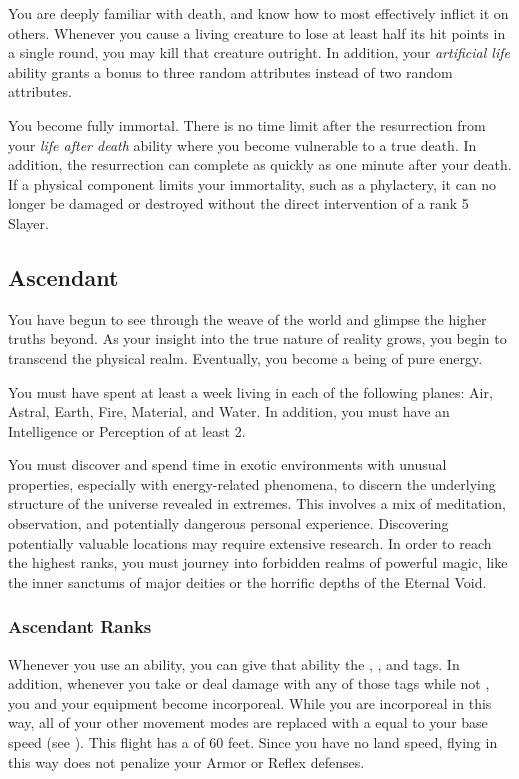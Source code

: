        You are deeply familiar with death, and know how to most effectively inflict it on others.
      Whenever you cause a living creature to lose at least half its hit points in a single round, you may kill that creature outright.
      In addition, your \textit{artificial life} ability grants a bonus to three random attributes instead of two random attributes.

       You become fully immortal. There is no time limit after the resurrection from your \textit{life after death} ability where you become vulnerable to a true death. In addition, the resurrection can complete as quickly as one minute after your death. If a physical component limits your immortality, such as a phylactery, it can no longer be damaged or destroyed without the direct intervention of a rank 5 Slayer.

  \subsection{Ascendant}
    You have begun to see through the weave of the world and glimpse the higher truths beyond.
    As your insight into the true nature of reality grows, you begin to transcend the physical realm.
    Eventually, you become a being of pure energy.

     You must have spent at least a week living in each of the following planes: Air, Astral, Earth, Fire, Material, and Water.
    In addition, you must have an Intelligence or Perception of at least 2.

     You must discover and spend time in exotic environments with unusual properties, especially with energy-related phenomena, to discern the underlying structure of the universe revealed in extremes.
    This involves a mix of meditation, observation, and potentially dangerous personal experience.
    Discovering potentially valuable locations may require extensive research.
    In order to reach the highest ranks, you must journey into forbidden realms of powerful magic, like the inner sanctums of major deities or the horrific depths of the Eternal Void.

    \subsubsection{Ascendant Ranks}

       Whenever you use an ability, you can give that ability the \atCold, \atElectricity, and \atFire tags.
      In addition, whenever you take or deal damage with any of those tags while not , you and your equipment  become incorporeal.
      While you are incorporeal in this way, all of your other movement modes are replaced with a  equal to your base speed (see ).
      This flight has a  of 60 feet.
      Since you have no land speed, flying in this way does not penalize your Armor or Reflex defenses.

